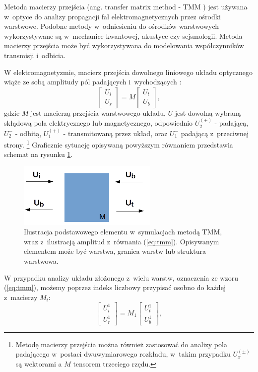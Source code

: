 \label{subart:tmm}
Metoda macierzy przejścia  (ang. transfer matrix method - TMM ) jest używana w~optyce do analizy propagacji fal elektromagnetycznych przez ośrodki warstwowe. Podobne metody w~odniesieniu do ośrodków warstwowych wykorzystywane są w~mechanice kwantowej, akustyce czy sejsmologii. Metoda macierzy przejścia może być wykorzystywana do modelowania współczynników transmisji i~odbicia.

W elektromagnetyzmie, macierz przejścia dowolnego liniowego układu optycznego wiąże ze sobą amplitudy pól padających i~wychodzących \cite{markos2008wave,teich1991fundamentalsTMM}:
\begin{equation}
\begin{bmatrix}
U_i \\ 
U_r
\end{bmatrix}
= M 
\begin{bmatrix}
U_t \\
U_b
\end{bmatrix},
\label{eq:tmm}
\end{equation}
gdzie $M$ jest macierzą przejścia warstwowego układu, $U$ jest dowolną wybraną skłądową pola elektrycznego lub magnetycznego, odpowiednio $U_2^{(+)}$ - padającą, $U_2^{-}$ - odbitą, $U_1^{(+)}$ - transmitowaną przez układ, oraz $U_1^{-}$ padającą  z~przeciwnej strony. \footnote{Metodę macierzy przejścia można również zastosować do analizy pola padającego w~postaci dwuwymiarowego rozkładu, w~takim przypadku $U_x^{(\pm)}$ są wektorami a $M$ tensorem trzeciego rzędu.} Graficznie sytuację opisywaną powyższym równaniem przedstawia schemat na rysunku \ref{fig:tmm-simple}.

\begin{figure}
	\includegraphics[width=0.6\textwidth]{images/tmm.png}
	\caption{Ilustracja podstawowego elementu w~symulacjach metodą TMM, wraz z~ilustracją amplitud z~równania (\ref{eq:tmm}). Opisywanym elementem może być warstwa, granica warstw lub struktura warstwowa. }
	\label{fig:tmm-simple}
\end{figure}

W przypadku analizy układu złożonego z~wielu warstw, oznaczenia ze wzoru (\ref{eq:tmm}), możemy poprzez indeks liczbowy przypisać osobno do każdej z~macierzy $M_i$:
\begin{equation}
\begin{bmatrix}
U_i^1 \\ 
U_r^1
\end{bmatrix}
= M_1 
\begin{bmatrix}
U_t^1 \\
U_b^1
\end{bmatrix},
\label{eq:tmm-1l}
\end{equation}


